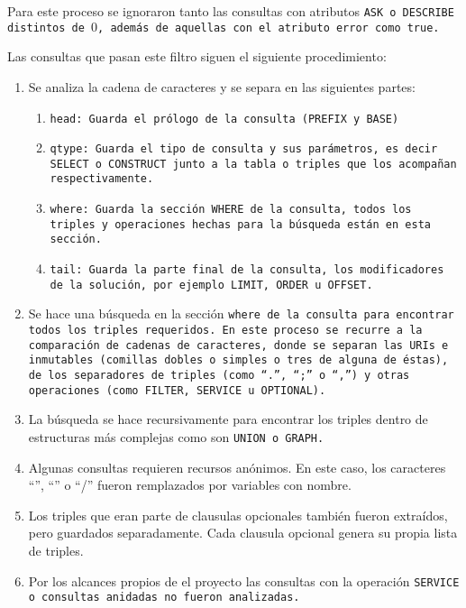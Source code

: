 Para este proceso se ignoraron tanto las consultas con atributos \tt{ASK} o
\tt{DESCRIBE} distintos de $0$, además de aquellas con el atributo \tt{error}
como \tt{true}.

Las consultas que pasan este filtro siguen el siguiente procedimiento:
\begin{enumerate}
  \item
    Se analiza la cadena de caracteres y se separa en las siguientes partes:
    \begin{enumerate}
      \item
        \tt{head}: Guarda el prólogo de la consulta (\tt{PREFIX} y \tt{BASE})
      \item
        \tt{qtype}: Guarda el tipo de consulta y sus parámetros, es decir
        \tt{SELECT} o \tt{CONSTRUCT} junto a la tabla o triples que los
        acompañan respectivamente.
      \item
        \tt{where}: Guarda la sección \tt{WHERE} de la consulta, todos los
        triples y operaciones hechas para la búsqueda están en esta sección.
      \item
        \tt{tail}: Guarda la parte final de la consulta, los modificadores de la
        solución, por ejemplo \tt{LIMIT}, \tt{ORDER} u \tt{OFFSET}.
    \end{enumerate}
  \item
    Se hace una búsqueda en la sección \tt{where} de la consulta para encontrar
    todos los triples requeridos. En este proceso se recurre a la comparación de
    cadenas de caracteres, donde se separan las URIs e inmutables (comillas
    dobles o simples o tres de alguna de éstas), de los separadores de triples
    (como ``\tt{.}'', ``\tt{;}'' o ``\tt{,}'') y otras operaciones (como
    \tt{FILTER},    \tt{SERVICE} u \tt{OPTIONAL}).
  \item
    La búsqueda se hace recursivamente para encontrar los triples dentro de
    estructuras más complejas como son \tt{UNION} o \tt{GRAPH}.
  \item
    Algunas consultas requieren recursos anónimos. En este caso, los
    caracteres ``\lbrack'', ``\rbrack'' o ``/'' fueron remplazados por variables
    con nombre.
  \item
    Los triples que eran parte de clausulas opcionales también fueron extraídos,
    pero guardados separadamente. Cada clausula opcional genera su propia lista
    de triples.
  \item
    Por los alcances propios de el proyecto las consultas con la operación
    \tt{SERVICE} o consultas anidadas no fueron analizadas.
\end{enumerate}

